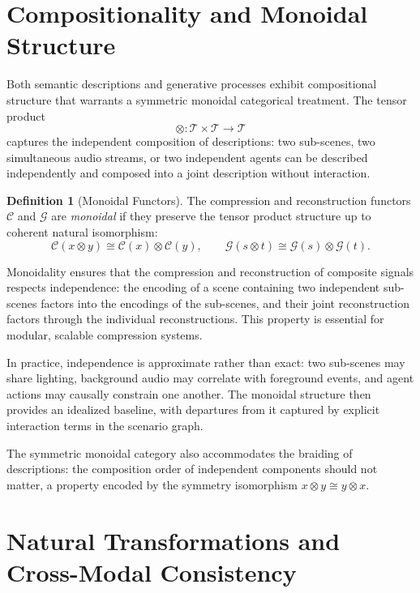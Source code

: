 \documentclass[12pt,a4paper]{article}
\theoremstyle{definition}
\newtheorem{definition}[theorem]{Definition}
\theoremstyle{remark}
\begin{document}
\section{Compositionality and Monoidal Structure}
\label{sec:monoidal}

Both semantic descriptions and generative processes exhibit compositional structure that warrants a symmetric monoidal categorical treatment. The tensor product
\[
\otimes : \mathcal{T} \times \mathcal{T} \rightarrow \mathcal{T}
\]
captures the independent composition of descriptions: two sub-scenes, two simultaneous audio streams, or two independent agents can be described independently and composed into a joint description without interaction.

\begin{definition}[Monoidal Functors]
The compression and reconstruction functors $\mathcal{C}$ and $\mathcal{G}$ are \emph{monoidal} if they preserve the tensor product structure up to coherent natural isomorphism:
\[
\mathcal{C}(x \otimes y) \cong \mathcal{C}(x) \otimes \mathcal{C}(y), \qquad \mathcal{G}(s \otimes t) \cong \mathcal{G}(s) \otimes \mathcal{G}(t).
\]
\end{definition}

Monoidality ensures that the compression and reconstruction of composite signals respects independence: the encoding of a scene containing two independent sub-scenes factors into the encodings of the sub-scenes, and their joint reconstruction factors through the individual reconstructions. This property is essential for modular, scalable compression systems.

In practice, independence is approximate rather than exact: two sub-scenes may share lighting, background audio may correlate with foreground events, and agent actions may causally constrain one another. The monoidal structure then provides an idealized baseline, with departures from it captured by explicit interaction terms in the scenario graph.

The symmetric monoidal category also accommodates the braiding of descriptions: the composition order of independent components should not matter, a property encoded by the symmetry isomorphism $x \otimes y \cong y \otimes x$.

\section{Natural Transformations and Cross-Modal Consistency}
\label{sec:natural}
\end{document}
